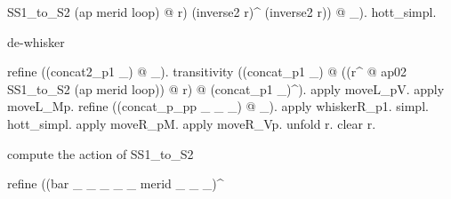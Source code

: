 \begin{coqdoccode}
\begin{coqdoccomment}
SS1\_to\_S2\coqdocindent{0.50em}
(ap\coqdocindent{0.50em}
merid\coqdocindent{0.50em}
loop)\coqdocindent{0.50em}
@\coqdocindent{0.50em}
r)\coqdocindent{0.50em}
(inverse2\coqdocindent{0.50em}
r)\^{}\coqdocindent{0.50em}
(inverse2\coqdocindent{0.50em}
r))\coqdocindent{0.50em}
@\coqdocindent{0.50em}
\_).\coqdoceol
\coqdocindent{1.00em}
hott\_simpl.\coqdoceol
\coqdoceol
\coqdocindent{1.00em}
\begin{coqdoccomment}
\coqdocindent{0.50em}
de-whisker\coqdocindent{0.50em}
\end{coqdoccomment}
\coqdoceol
\coqdocindent{1.00em}
refine\coqdocindent{0.50em}
((concat2\_p1\coqdocindent{0.50em}
\_)\coqdocindent{0.50em}
@\coqdocindent{0.50em}
\_).\coqdoceol
\coqdocindent{1.00em}
transitivity\coqdocindent{0.50em}
((concat\_p1\coqdocindent{0.50em}
\_)\coqdocindent{0.50em}
\coqdoceol
\coqdocindent{8.00em}
@\coqdocindent{0.50em}
((r\^{}\coqdocindent{0.50em}
@\coqdocindent{0.50em}
ap02\coqdocindent{0.50em}
SS1\_to\_S2\coqdocindent{0.50em}
(ap\coqdocindent{0.50em}
merid\coqdocindent{0.50em}
loop))\coqdocindent{0.50em}
@\coqdocindent{0.50em}
r)\coqdocindent{0.50em}
\coqdoceol
\coqdocindent{8.00em}
@\coqdocindent{0.50em}
(concat\_p1\coqdocindent{0.50em}
\_)\^{}).\coqdoceol
\coqdocindent{1.00em}
apply\coqdocindent{0.50em}
moveL\_pV.\coqdocindent{0.50em}
apply\coqdocindent{0.50em}
moveL\_Mp.\coqdocindent{0.50em}
\coqdoceol
\coqdocindent{1.00em}
refine\coqdocindent{0.50em}
((concat\_p\_pp\coqdocindent{0.50em}
\_\coqdocindent{0.50em}
\_\coqdocindent{0.50em}
\_)\coqdocindent{0.50em}
@\coqdocindent{0.50em}
\_).\coqdocindent{0.50em}
\coqdoceol
\coqdocindent{1.00em}
apply\coqdocindent{0.50em}
whiskerR\_p1.\coqdocindent{0.50em}
simpl.\coqdocindent{0.50em}
hott\_simpl.\coqdoceol
\coqdocindent{1.00em}
apply\coqdocindent{0.50em}
moveR\_pM.\coqdocindent{0.50em}
apply\coqdocindent{0.50em}
moveR\_Vp.\coqdoceol
\coqdocindent{1.00em}
unfold\coqdocindent{0.50em}
r.\coqdocindent{0.50em}
clear\coqdocindent{0.50em}
r.\coqdoceol
\coqdoceol
\coqdocindent{1.00em}
\begin{coqdoccomment}
\coqdocindent{0.50em}
compute\coqdocindent{0.50em}
the\coqdocindent{0.50em}
action\coqdocindent{0.50em}
of\coqdocindent{0.50em}
SS1\_to\_S2\coqdocindent{0.50em}
\end{coqdoccomment}
\coqdoceol
\coqdocindent{1.00em}
refine\coqdocindent{0.50em}
((bar\coqdocindent{0.50em}
\_\coqdocindent{0.50em}
\_\coqdocindent{0.50em}
\_\coqdocindent{0.50em}
\_\coqdocindent{0.50em}
\_\coqdocindent{0.50em}
merid\coqdocindent{0.50em}
\_\coqdocindent{0.50em}
\_\coqdocindent{0.50em}
\_)\^{}\coqdocindent{0.50em}

\end{coqdoccomment}
\end{coqdoccode}
